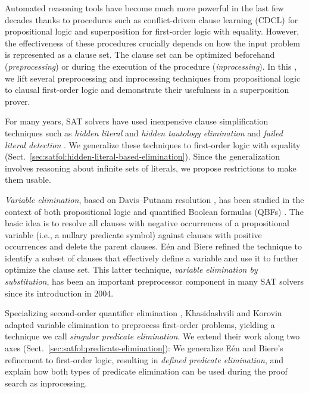 Automated reasoning tools have become much more powerful in the last few
decades thanks to procedures such as conflict-driven clause learning (CDCL)
\cite{MSLM09HBSAT} for propositional logic and superposition
\cite{bg-94-superposition} for first-order logic with equality. However,
the effectiveness of these procedures crucially depends on how the input
problem is represented as a clause set. The clause set
can be optimized beforehand (\emph{preprocessing}) or during the execution of
the procedure (\emph{inprocessing}). In this \paper, we lift several preprocessing and
inprocessing techniques from propositional logic to clausal first-order logic
and demonstrate their usefulness in a superposition prover.

For many years, SAT solvers have used inexpensive clause simplification
techniques such as \emph{hidden literal} and \emph{hidden tautology elimination}
\cite{hjb-2010-cl-elim,hjb-2011-big-simplification} and \emph{failed literal
detection} \cite[Sect.~1.6]{jwf-1995-fld}. We generalize these techniques to
first-order logic with equality
(Sect.~\ref{sec:satfol:hidden-literal-based-elimination}). Since the generalization
involves reasoning about infinite sets of literals, we propose restrictions to
make them usable.

\emph{Variable elimination}, based on Davis--Putnam resolution \cite{dp-60-dp}, has
been studied in the context of both propositional logic
\cite{sp-04-niver,cs-00-zres} and quantified Boolean formulas (QBFs)
\cite{ab-2004-re}. The basic idea is to resolve all clauses with negative
occurrences of a propositional variable (i.e., a nullary predicate symbol) against
clauses with positive occurrences and delete the parent clauses. E\'en and
Biere \cite{eb-2005-satpreprocess} refined the technique to identify a subset
of clauses that effectively define a variable and use it to further optimize the
clause set. This latter technique, \emph{variable elimination by substitution},
has been an important preprocessor component in many SAT solvers since its
introduction in 2004.

Specializing second-order quantifier elimination
\cite{go-1992-so-pred-elim,hjo-1996-scan}, Khasidashvili and Korovin
\cite{kk-2016-pe-fol} adapted variable elimination to preprocess first-order
problems, yielding a technique we call \emph{singular predicate elimination}. We
extend their work along two axes (Sect.~\ref{sec:satfol:predicate-elimination}): We
generalize E\'en and Biere's refinement to first-order logic, resulting in
\emph{defined predicate elimination}, and explain how both types of predicate
elimination can be used during the proof search as inprocessing.


